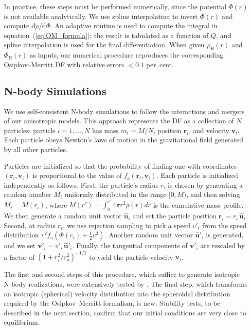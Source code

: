 \documentclass[fleqn,usenatbib]{mnras}
\begin{document}
In practice, these steps must be performed numerically, since the potential $\Phi(r)$ is not available analytically. We use spline interpolation to invert $\Phi(r)$ and compute $\mathrm{d}\tilde{\rho} / \mathrm{d}\Phi$. An adaptive routine is used to compute the integral in equation~(\ref{eq:OM_formula}); the result is tabulated as a function of $Q$, and spline interpolation is used for the final differentiation. When given $\rho_\mathrm{H}(r)$ and $\Phi_\mathrm{H}(r)$ as inputs, our numerical procedure reproduces the corresponding Osipkov--Merritt DF \citep{Hernquist1990} with relative errors $< 0.1$ per~cent.

\subsection{N-body Simulations}
\label{sec:nbody}

We use self-consistent N-body simulations to follow the interactions and mergers of our anisotropic models. This approach represents the DF as a collection of $N$ particles; particle $i = 1, \dots, N$ has mass $m_i = M / N$, position $\mathbf{r}_i$, and velocity $\mathbf{v}_i$. Each particle obeys Newton's laws of motion in the gravitational field generated by all other particles.

Particles are initialized so that the probability of finding one with coordinates $(\mathbf{r}_i, \mathbf{v}_i)$ is proportional to the value of $f_\mathrm{a}(\mathbf{r}_i, \mathbf{v}_i)$. Each particle is initialized independently as follows. First, the particle's radius $r_i$ is chosen by generating a random number $M_i$ uniformly distributed in the range $[0, M)$, and then solving $M_i = M(r_i)$, where $M(r') = \int_{0}^{r'} 4 \pi r^2 \rho(r) dr$ is the cumulative mass profile. We then generate a random unit vector $\hat{\mathbf{u}}_i$ and set the particle position $\mathbf{r}_i = r_i \, \hat{\mathbf{u}}_i$. Second, at radius $r_i$, we use rejection sampling to pick a speed $v'_i$ from the speed distribution $v^2 f_\mathrm{a}(\Phi(r_i) + \frac{1}{2} v^2)$. Another random unit vector $\hat{\mathbf{u}}'_i$ is generated, and we set $\mathbf{v}'_i = v'_i \, \hat{\mathbf{u}}'_i$. Finally, the tangential components of $\mathbf{v}'_i$ are rescaled by a factor of $(1 + r_i^2 / r_\mathrm{a}^2)^{-1/2}$ to yield the particle velocity $\mathbf{v}_i$.

The first and second steps of this procedure, which suffice to generate isotropic N-body realizations, were extensively tested by \citet{Barnes2012}. The final step, which transforms an isotropic (spherical) velocity distribution into the spheroidal distribution required by the Osipkov--Merritt formalism, is new. Stability tests, to be described in the next section, confirm that our initial conditions are very close to equilibrium. 
\end{document}
